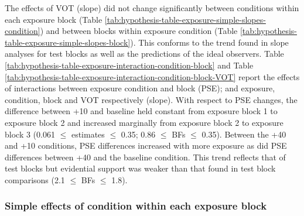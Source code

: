 \documentclass[
  11pt,
  man,mask,floatsintext]{apa6}
\begin{document}
The effects of VOT (slope) did not change significantly between conditions within each exposure block (Table \ref{tab:hypothesis-table-exposure-simple-slopes-condition}) and between blocks within exposure condition (Table \ref{tab:hypothesis-table-exposure-simple-slopes-block}). This conforms to the trend found in slope analyses for test blocks as well as the predictions of the ideal observers. Table \ref{tab:hypothesis-table-exposure-interaction-condition-block} and Table \ref{tab:hypothesis-table-exposure-interaction-condition-block-VOT} report the effects of interactions between exposure condition and block (PSE); and exposure, condition, block and VOT respectively (slope). With respect to PSE changes, the difference between +10 and baseline held constant from exposure block 1 to exposure block 2 and increased marginally from exposure block 2 to exposure block 3 (0.061 \(\leq\) estimates \(\leq\) 0.35; 0.86 \(\leq\) BFs \(\leq\) 0.35). Between the +40 and +10 conditions, PSE differences increased with more exposure as did PSE differences between +40 and the baseline condition. This trend reflects that of test blocks but evidential support was weaker than that found in test block comparisons (2.1 \(\leq\) BFs \(\leq\) 1.8).

\subsubsection{Simple effects of condition within each exposure block}\label{simple-effects-of-condition-within-each-exposure-block}
\end{document}
